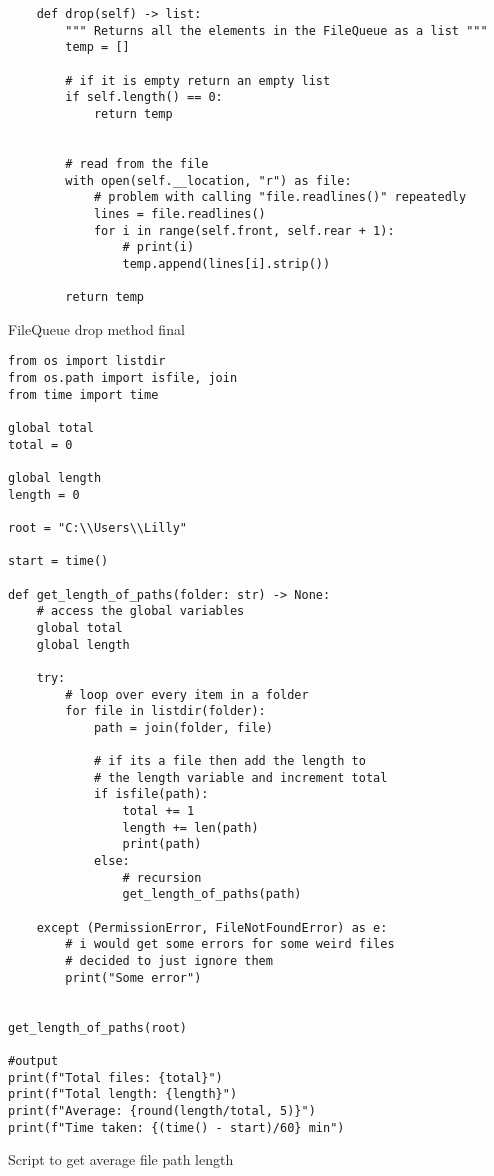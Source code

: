 \newpage
\begin{listing}[!ht]
    \begin{verbatim}
    def drop(self) -> list:
        """ Returns all the elements in the FileQueue as a list """
        temp = []
        
        # if it is empty return an empty list
        if self.length() == 0:
            return temp
        
        
        # read from the file
        with open(self.__location, "r") as file:
            # problem with calling "file.readlines()" repeatedly
            lines = file.readlines()
            for i in range(self.front, self.rear + 1):
                # print(i)
                temp.append(lines[i].strip())
                
        return temp
    \end{verbatim}
    \caption{FileQueue drop method final}
    \label{sc:fileq-drop-method-final}
\end{listing}


\newpage
\begin{listing}[!ht]
    \begin{verbatim}
from os import listdir
from os.path import isfile, join
from time import time

global total
total = 0

global length
length = 0

root = "C:\\Users\\Lilly"

start = time()

def get_length_of_paths(folder: str) -> None:
    # access the global variables
    global total
    global length
    
    try:
        # loop over every item in a folder 
        for file in listdir(folder):
            path = join(folder, file)
            
            # if its a file then add the length to 
            # the length variable and increment total
            if isfile(path):
                total += 1
                length += len(path)
                print(path)
            else:
                # recursion
                get_length_of_paths(path)
                
    except (PermissionError, FileNotFoundError) as e: 
        # i would get some errors for some weird files
        # decided to just ignore them 
        print("Some error")
            
            
get_length_of_paths(root)

#output
print(f"Total files: {total}")
print(f"Total length: {length}")
print(f"Average: {round(length/total, 5)}")
print(f"Time taken: {(time() - start)/60} min")
    \end{verbatim}
    \caption{Script to get average file path length}
    \label{sc:avg-filepath-length-file}
\end{listing}


